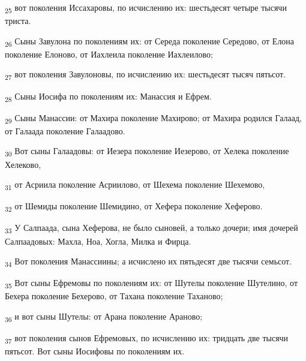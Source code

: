 \begin{tcolorbox}
\textsubscript{25} вот поколения Иссахаровы, по исчислению их: шестьдесят четыре тысячи триста.
\end{tcolorbox}
\begin{tcolorbox}
\textsubscript{26} Сыны Завулона по поколениям их: от Середа поколение Середово, от Елона поколение Елоново, от Иахлеила поколение Иахлеилово;
\end{tcolorbox}
\begin{tcolorbox}
\textsubscript{27} вот поколения Завулоновы, по исчислению их: шестьдесят тысяч пятьсот.
\end{tcolorbox}
\begin{tcolorbox}
\textsubscript{28} Сыны Иосифа по поколениям их: Манассия и Ефрем.
\end{tcolorbox}
\begin{tcolorbox}
\textsubscript{29} Сыны Манассии: от Махира поколение Махирово; от Махира родился Галаад, от Галаада поколение Галаадово.
\end{tcolorbox}
\begin{tcolorbox}
\textsubscript{30} Вот сыны Галаадовы: от Иезера поколение Иезерово, от Хелека поколение Хелеково,
\end{tcolorbox}
\begin{tcolorbox}
\textsubscript{31} от Асриила поколение Асриилово, от Шехема поколение Шехемово,
\end{tcolorbox}
\begin{tcolorbox}
\textsubscript{32} от Шемиды поколение Шемидино, от Хефера поколение Хеферово.
\end{tcolorbox}
\begin{tcolorbox}
\textsubscript{33} У Салпаада, сына Хеферова, не было сыновей, а только дочери; имя дочерей Салпаадовых: Махла, Ноа, Хогла, Милка и Фирца.
\end{tcolorbox}
\begin{tcolorbox}
\textsubscript{34} Вот поколения Манассиины; а исчислено их пятьдесят две тысячи семьсот.
\end{tcolorbox}
\begin{tcolorbox}
\textsubscript{35} Вот сыны Ефремовы по поколениям их: от Шутелы поколение Шутелино, от Бехера поколение Бехерово, от Тахана поколение Таханово;
\end{tcolorbox}
\begin{tcolorbox}
\textsubscript{36} и вот сыны Шутелы: от Арана поколение Араново;
\end{tcolorbox}
\begin{tcolorbox}
\textsubscript{37} вот поколения сынов Ефремовых, по исчислению их: тридцать две тысячи пятьсот. Вот сыны Иосифовы по поколениям их.
\end{tcolorbox}

